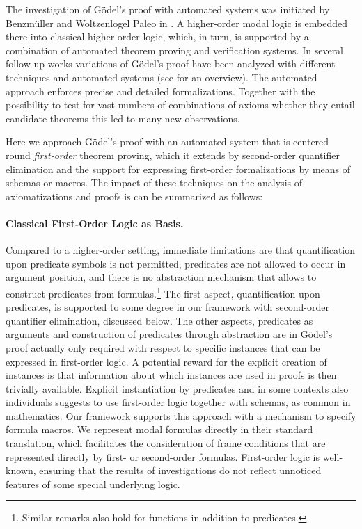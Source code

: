 \documentclass[a4paper]{article}
\begin{document}
  The investigation of Gödel's proof with automated systems was initiated by
  Benz\-müller and Woltzenlogel Paleo in \cite{benzmueller:etal:2014:goedel}.
  A higher-order modal logic is embedded there into classical higher-order
  logic, which, in turn, is supported by a combination of automated theorem
  proving and verification systems. In several follow-up works variations of
  Gödel's proof have been analyzed with different techniques and automated
  systems (see \cite{kirchner:etal:2019:metaphysics} for an overview).  The
  automated approach enforces precise and detailed formalizations. Together
  with the possibility to test for vast numbers of combinations of axioms
  whether they entail candidate theorems this led to many new observations.
  
  Here we approach Gödel's proof with an automated system that is centered
  round \emph{first-order} theorem proving, which it extends by second-order
  quantifier elimination and the support for expressing first-order
  formalizations by means of schemas or macros.  The impact of these
  techniques on the analysis of axiomatizations and proofs is can be
  summarized as follows:

  \paragraph{Classical First-Order Logic as Basis.}

  Compared to a higher-order setting, immediate limitations are that
  quantification upon predicate symbols is not permitted, predicates are not
  allowed to occur in argument position, and there is no abstraction mechanism
  that allows to construct predicates from formulas.\footnote{Similar remarks
  also hold for functions in addition to predicates.}  The first aspect,
  quantification upon predicates, is supported to some degree in our framework
  with second-order quantifier elimination, discussed below.  The other
  aspects, predicates as arguments and construction of predicates through
  abstraction are in Gödel's proof actually only required with respect to
  specific instances that can be expressed in first-order logic.  A potential
  reward for the explicit creation of instances is that information about
  which instances are used in proofs is then trivially available.  Explicit
  instantiation by predicates and in some contexts also individuals suggests
  to use first-order logic together with schemas, as common in mathematics.
  Our framework supports this approach with a mechanism to specify formula
  macros.  We represent modal formulas directly in their standard translation,
  which facilitates the consideration of frame conditions that are represented
  directly by first- or second-order formulas.  First-order logic is
  well-known, ensuring that the results of investigations do not reflect
  unnoticed features of some special underlying logic.
  
\end{document}
